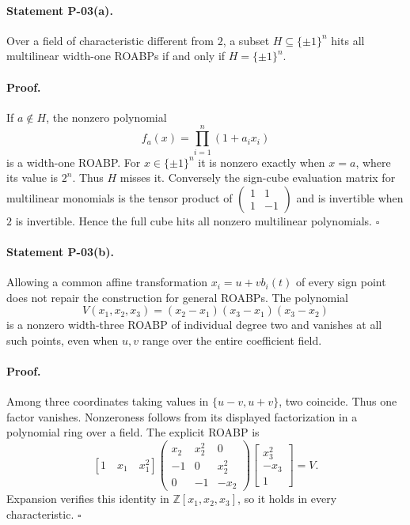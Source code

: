 \documentclass[11pt,a4paper]{article}
\theoremstyle{definition}\newtheorem{definition}{Definition}
\begin{document}
\paragraph{Statement P-03(a).}
Over a field of characteristic different from $2$, a subset $H\subseteq\{\pm1\}^n$ hits all multilinear width-one ROABPs if and only if $H=\{\pm1\}^n$.
\paragraph{Proof.}
If $a\notin H$, the nonzero polynomial
\[
 f_a(x)=\prod_{i=1}^n(1+a_ix_i)
\]
is a width-one ROABP. For $x\in\{\pm1\}^n$ it is nonzero exactly when $x=a$, where its value is $2^n$. Thus $H$ misses it. Conversely the sign-cube evaluation matrix for multilinear monomials is the tensor product of $\begin{pmatrix}1&1\\1&-1\end{pmatrix}$ and is invertible when $2$ is invertible. Hence the full cube hits all nonzero multilinear polynomials. $\square$

\paragraph{Statement P-03(b).}
Allowing a common affine transformation $x_i=u+vb_i(t)$ of every sign point does not repair the construction for general ROABPs. The polynomial
\[
 V(x_1,x_2,x_3)=(x_2-x_1)(x_3-x_1)(x_3-x_2)
\]
is a nonzero width-three ROABP of individual degree two and vanishes at all such points, even when $u,v$ range over the entire coefficient field.
\paragraph{Proof.}
Among three coordinates taking values in $\{u-v,u+v\}$, two coincide. Thus one factor vanishes. Nonzeroness follows from its displayed factorization in a polynomial ring over a field. The explicit ROABP is
\[
 [1\quad x_1\quad x_1^2]
 \begin{pmatrix}
 x_2&x_2^2&0\\-1&0&x_2^2\\0&-1&-x_2
 \end{pmatrix}
 \begin{bmatrix}x_3^2\\-x_3\\1\end{bmatrix}=V.
\]
Expansion verifies this identity in $\mathbb Z[x_1,x_2,x_3]$, so it holds in every characteristic. $\square$
\end{document}
